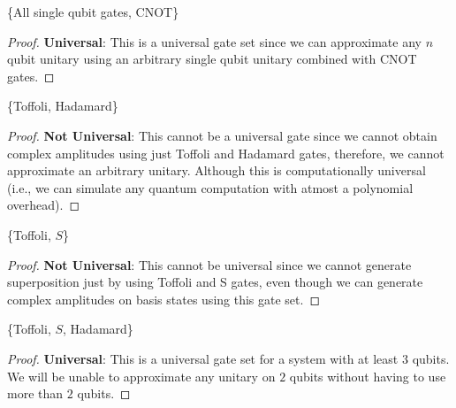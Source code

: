 \begin{solution}[label=ques:4a]
  \begin{question}
    \{All single qubit gates, CNOT\}
  \end{question}
  \tcblower{}
  \begin{proof}
    \textbf{Universal}: This is a universal gate set since we can approximate any $n$ qubit unitary using an arbitrary single qubit unitary combined with CNOT gates.
  \end{proof}
\end{solution}

\begin{solution}[label=ques:4b]
  \begin{question}
    \{Toffoli, Hadamard\}
  \end{question}
  \tcblower{}
  \begin{proof}
    \textbf{Not Universal}: This cannot be a universal gate since we cannot obtain complex amplitudes using just Toffoli and Hadamard gates, therefore, we cannot approximate an arbitrary unitary. Although this is computationally universal (i.e., we can simulate any quantum computation with atmost a polynomial overhead).
  \end{proof}
\end{solution}

\begin{solution}[label=ques:4c]
  \begin{question}
    \{Toffoli, $S$\}
  \end{question}
  \tcblower{}
  \begin{proof}
    \textbf{Not Universal}: This cannot be universal since we cannot generate superposition just by using Toffoli and S gates, even though we can generate complex amplitudes on basis states using this gate set.
  \end{proof}
\end{solution}

\begin{solution}[label=ques:4d]
  \begin{question}
    \{Toffoli, $S$, Hadamard\}
  \end{question}
  \tcblower{}
  \begin{proof}
    \textbf{Universal}: This is a universal gate set for a system with at least $3$ qubits. We will be unable to approximate any unitary on $2$ qubits without having to use more than $2$ qubits.
  \end{proof}
\end{solution}

